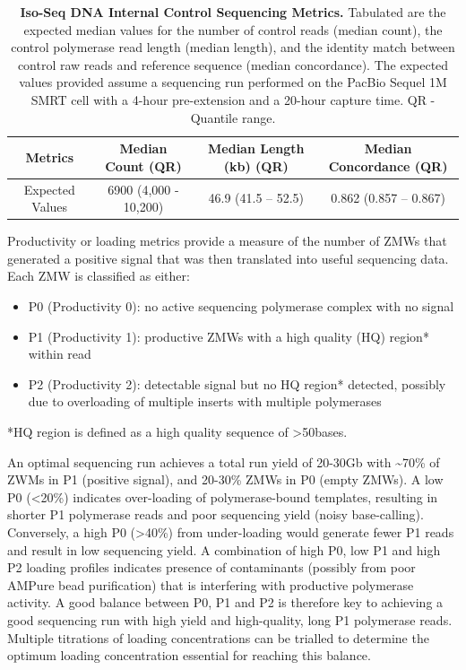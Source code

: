 \vspace{1cm}
\begin{table}[!h]
	\caption[Iso-Seq DNA Internal Control Sequencing Metrics]%
	{\textbf{Iso-Seq DNA Internal Control Sequencing Metrics.} Tabulated are the expected median values for the number of control reads (median count), the control polymerase read length (median length), and the identity match between control raw reads and reference sequence (median concordance). The expected values provided assume a sequencing run performed on the PacBio Sequel 1M SMRT cell with a 4-hour pre-extension and a 20-hour capture time. QR - Quantile range.}	\label{tab:control_Isoseqmetrics}
	
	\centering
	\begin{tabular}{@{}cccc@{}}
		\toprule
		Metrics         & Median Count (QR)     & Median Length (kb) (QR) & Median Concordance (QR) \\ \midrule
		Expected Values & 6900 (4,000 - 10,200) & 46.9 (41.5 – 52.5) & 0.862 (0.857 – 0.867)   \\ \bottomrule
	\end{tabular}
\end{table}


Productivity or loading metrics provide a measure of the number of ZMWs that generated a positive signal that was then translated into useful sequencing data. Each ZMW is classified as either: 
\begin{itemize}
	\item P0 (Productivity 0): no active sequencing polymerase complex with no signal 
	\item P1 (Productivity 1): productive ZMWs with a high quality (HQ) region* within read 
	\item P2 (Productivity 2): detectable signal but no HQ region* detected, possibly due to overloading of multiple inserts with multiple polymerases
\end{itemize}
*HQ region is defined as a high quality sequence of >50bases.   

An optimal sequencing run achieves a total run yield of 20-30Gb with \textasciitilde70\% of ZWMs in P1 (positive signal), and 20-30\% ZMWs in P0 (empty ZMWs). A low P0 (<20\%) indicates over-loading of polymerase-bound templates, resulting in shorter P1 polymerase reads and poor sequencing yield (noisy base-calling). Conversely, a high P0 (>40\%) from under-loading would generate fewer P1 reads and result in low sequencing yield. A combination of high P0, low P1 and high P2 loading profiles indicates presence of contaminants (possibly from poor AMPure bead purification) that is interfering with productive polymerase activity. A good balance between P0, P1 and P2 is therefore key to achieving a good sequencing run with high yield and high-quality, long P1 polymerase reads. Multiple titrations of loading concentrations can be trialled to determine the optimum loading concentration essential for reaching this balance. 

